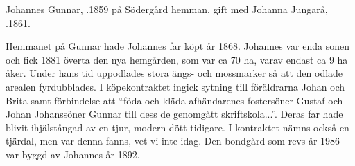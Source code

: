 Johannes Gunnar, .1859 på Södergård hemman, gift med Johanna Jungarå, .1861.
\begin{jhchildren}
  \item {}
  \item {}
  \item {}
  \item {}
  \item {}
  \item {}
  \item {}
  \item {}
  \item {}
  \item {}
  \item {}
  \item {}
\end{jhchildren}

Hemmanet på Gunnar hade Johannes far köpt år 1868. Johannes var enda sonen och fick 1881 överta den nya hemgården, som var ca 70 ha, varav endast ca 9 ha åker. Under hans tid uppodlades stora ängs- och mossmarker så att den odlade arealen fyrdubblades. I köpekontraktet ingick sytning till föräldrarna Johan och Brita samt förbindelse att ``föda och kläda afhändarenes fostersöner Gustaf och Johan Johanssöner Gunnar till dess de genomgått skriftskola...''. Deras far hade blivit ihjälstångad av en tjur, modern dött tidigare. I kontraktet nämns också en tjärdal, men var denna fanns, vet vi inte idag. Den bondgård som revs år 1986 var byggd av Johannes år 1892.


